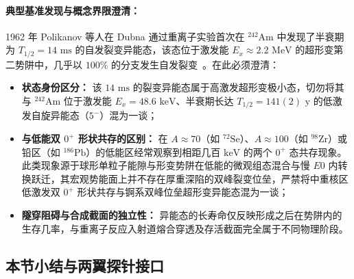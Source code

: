 \paragraph{典型基准发现与概念界限澄清：}
1962 年 Polikanov 等人在 Dubna 通过重离子实验首次在 $^{242}\mathrm{Am}$ 中发现了半衰期为 $T_{1/2} = 14\text{ ms}$ 的自发裂变异能态，该态位于激发能 $E_x \approx 2.2\text{ MeV}$ 的超形变第二势阱中，几乎以 $100\%$ 的分支发生自发裂变~\cite{polikanov-1962-spontaneous-fission-isomer}。在此必须澄清：
\begin{itemize}
\item \textbf{状态身份区分：} 该 $14\text{ ms}$ 的裂变异能态属于高激发超形变极小态，切勿将其与 $^{242}\mathrm{Am}$ 位于激发能 $E_x = 48.6\text{ keV}$、半衰期长达 $T_{1/2} = 141(2)\text{ y}$ 的低激发自旋异能态（$5^-$）混为一谈；
\item \textbf{与低能双 $0^+$ 形状共存的区别：} 在 $A\approx 70$（如 $^{72}\mathrm{Se}$）、$A\approx 100$（如 $^{98}\mathrm{Zr}$）或铅区（如 $^{186}\mathrm{Pb}$）的低能区经常观察到相距几百 $\mathrm{keV}$ 的两个 $0^+$ 态共存现象。此类现象源于球形单粒子能隙与形变势阱在低能的微观组态混合与慢 $E0$ 内转换跃迁，其宏观势能面上并不存在厚重深陷的双峰裂变位垒，严禁将中重核区低激发双 $0^+$ 形状共存与锕系双峰位垒超形变异能态混为一谈；
\item \textbf{隧穿阻碍与合成截面的独立性：} 异能态的长寿命仅反映形成之后在势阱内的生存几率，与重离子反应入射道熔合穿透及存活截面完全属于不同物理阶段。
\end{itemize}

\subsection{本节小结与两翼探针接口}\label{sec:4-6-5}

